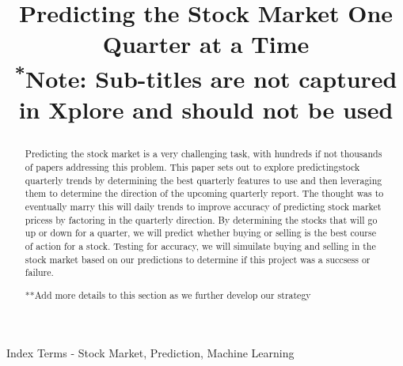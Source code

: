 \documentclass[conference]{IEEEtran}
\begin{document}
\title{Predicting the Stock Market One Quarter at a Time\\
{\footnotesize \textsuperscript{*}Note: Sub-titles are not captured in Xplore and
should not be used}

}

\author{
\and
{}
}

\maketitle



\begin{abstract}
Predicting the stock market is a very challenging task, with hundreds if not thousands of papers addressing this problem.  This paper sets out to explore predictingstock quarterly trends by determining the best quarterly features to use and then leveraging them to determine the direction of the upcoming quarterly report. The thought was to eventually marry this will daily trends to improve accuracy of predicting stock market pricess by factoring in the quarterly direction.  By determining the stocks that will go up or down for a quarter, we will predict whether buying or selling is the best course of action for a stock. Testing for accuracy, we will simuilate buying and selling in the stock market based on our predictions to determine if this project was a succsess or failure.  

**Add more details to this section as we further develop our strategy
\end{abstract}

\begin{IEEEkeywords}
Index Terms - Stock Market, Prediction, Machine Learning
\end{IEEEkeywords}


\end{document}
